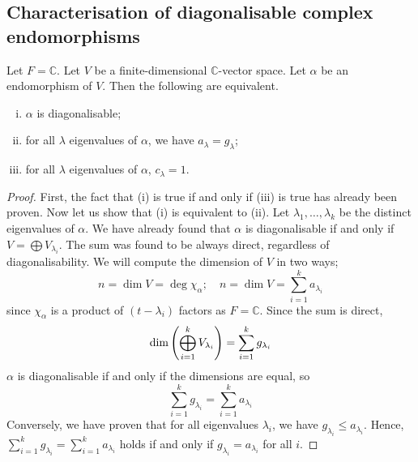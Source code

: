 \subsection{Characterisation of diagonalisable complex endomorphisms}
\begin{lemma}
	Let \( F = \mathbb C \).
	Let \( V \) be a finite-dimensional \( \mathbb C \)-vector space.
	Let \( \alpha \) be an endomorphism of \( V \).
	Then the following are equivalent.
	\begin{enumerate}[(i)]
		\item \( \alpha \) is diagonalisable;
		\item for all \( \lambda \) eigenvalues of \( \alpha \), we have \( a_\lambda = g_\lambda \);
		\item for all \( \lambda \) eigenvalues of \( \alpha \), \( c_\lambda = 1 \).
	\end{enumerate}
\end{lemma}
\begin{proof}
	First, the fact that (i) is true if and only if (iii) is true has already been proven.
	Now let us show that (i) is equivalent to (ii).
	Let \( \lambda_1, \dots, \lambda_k \) be the distinct eigenvalues of \( \alpha \).
	We have already found that \( \alpha \) is diagonalisable if and only if \( V = \bigoplus V_{\lambda_i} \).
	The sum was found to be always direct, regardless of diagonalisability.
	We will compute the dimension of \( V \) in two ways;
	\[
		n = \dim V = \deg \chi_\alpha;\quad n = \dim V = \sum_{i=1}^k a_{\lambda_i}
	\]
	since \( \chi_\alpha \) is a product of \( (t-\lambda_i) \) factors as \( F = \mathbb C \).
	Since the sum is direct,
	\[
		\dim \qty(\bigoplus_{i=1}^k V_{\lambda_i}) = \sum_{i=1}^k g_{\lambda_i}
	\]
	\( \alpha \) is diagonalisable if and only if the dimensions are equal, so
	\[
		\sum_{i=1}^k g_{\lambda_i} = \sum_{i=1}^k a_{\lambda_i}
	\]
	Conversely, we have proven that for all eigenvalues \( \lambda_i \), we have \( g_{\lambda_i} \leq a_{\lambda_i} \).
	Hence, \( \sum_{i=1}^k g_{\lambda_i} = \sum_{i=1}^k a_{\lambda_i} \) holds if and only if \( g_{\lambda_i} = a_{\lambda_i} \) for all \( i \).
\end{proof}
